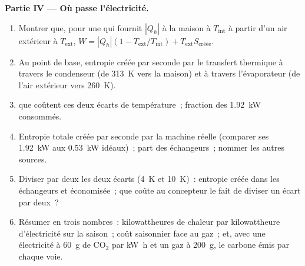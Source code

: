 \begin{problem}
\medskip
\noindent\textbf{Partie IV --- Où passe l'électricité.}
\begin{enumerate}[resume]
  \item Montrer que, pour une  qui fournit $|Q_h|$ à la
        maison à $T_{\mathrm{int}}$ à partir d'un air extérieur à $T_{\mathrm{ext}}$,
        $W = |Q_h|(1 - T_{\mathrm{ext}}/T_{\mathrm{int}}) + T_{\mathrm{ext}}S_{\text{créée}}$.
  \item Au point de base, entropie créée par seconde par le transfert
        thermique à travers le condenseur (de \qty{313}{K} vers la maison)
        et à travers l'évaporateur (de l'air extérieur vers \qty{260}{K}).
  \item {} que coûtent ces deux écarts de température~;
        fraction des \qty{1.92}{kW} consommés.
  \item Entropie totale créée par seconde par la machine réelle (comparer
        ses \qty{1.92}{kW} aux \qty{0.53}{kW} idéaux)~; part des
        échangeurs~; nommer les autres sources.
  \item Diviser par deux les deux écarts (\qty{4}{K} et \qty{10}{K})~:
        entropie créée dans les échangeurs et 
        économisée~; que coûte au concepteur le fait de diviser un écart
        par deux~?
  \item Résumer en trois nombres~: kilowattheures de chaleur par
        kilowattheure d'électricité sur la saison~; coût saisonnier face au
        gaz~; et, avec une électricité à \qty{60}{g} de CO$_2$ par
        \unit{kW h} et un gaz à \qty{200}{g}, le carbone émis par chaque voie.
\end{enumerate}
\end{problem}
